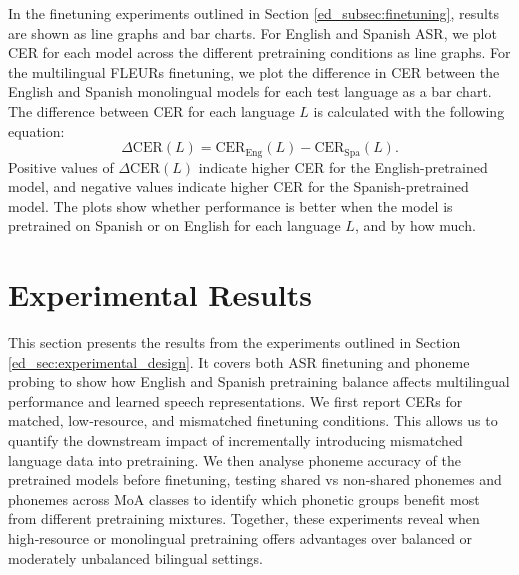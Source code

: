 In the finetuning experiments outlined in Section \ref{ed_subsec:finetuning}, results are shown as line graphs and bar charts. For English and Spanish ASR, we plot CER for each model across the different pretraining conditions as line graphs. For the multilingual FLEURs finetuning, we plot the difference in CER between the English and Spanish monolingual models for each test language as a bar chart. The difference between CER for each language \(L\) is calculated with the following equation:
\begin{equation}
\Delta \mathrm{CER}(L) = \mathrm{CER}_{\text{Eng}}(L) - \mathrm{CER}_{\text{Spa}}(L).
\label{eq:delta_cer}
\end{equation}
Positive values of \(\Delta \mathrm{CER}(L)\) indicate higher CER for the English-pretrained model, and negative values indicate higher CER for the Spanish-pretrained model. The plots show whether performance is better when the model is pretrained on Spanish or on English for each language \(L\), and by how much.


\newpage
\section{Experimental Results}\label{ed_sec:experimental_results}

This section presents the results from the experiments outlined in Section \ref{ed_sec:experimental_design}. It covers both ASR finetuning and phoneme probing to show how English and Spanish pretraining balance affects multilingual performance and learned speech representations. We first report CERs for matched, low‑resource, and mismatched finetuning conditions. This allows us to quantify the downstream impact of incrementally introducing mismatched language data into pretraining. We then analyse phoneme accuracy of the pretrained models before finetuning, testing shared vs non‑shared phonemes and phonemes across MoA classes to identify which phonetic groups benefit most from different pretraining mixtures. Together, these experiments reveal when high‑resource or monolingual pretraining offers advantages over balanced or moderately unbalanced bilingual settings.



